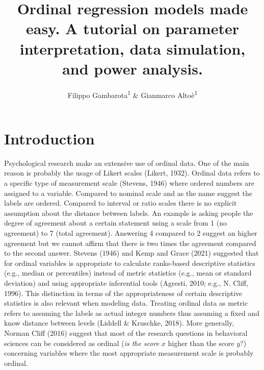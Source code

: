 \documentclass[
  man,floatsintext]{apa6}
\title{Ordinal regression models made easy. A tutorial on parameter interpretation, data simulation, and power analysis.}
\author{Filippo Gambarota\textsuperscript{1} \& Gianmarco Altoè\textsuperscript{1}}
\date{}
\affiliation{\vspace{0.5cm}\textsuperscript{1} Department of Developmental Psychology and Socialization, University of Padova, Italy}
\begin{document}
\maketitle

\section{Introduction}\label{introduction}

Psychological research make an extensive use of ordinal data. One of the main reason is probably the usage of Likert scales (Likert, 1932). Ordinal data refers to a specific type of measurement scale (Stevens, 1946) where ordered numbers are assigned to a variable. Compared to nominal scale and as the name suggest the labels are ordered. Compared to interval or ratio scales there is no explicit assumption about the distance between labels. An example is asking people the degree of agreement about a certain statement using a scale from 1 (no agreement) to 7 (total agreement). Answering 4 compared to 2 suggest an higher agreement but we cannot affirm that there is two times the agreement compared to the second answer. Stevens (1946) and Kemp and Grace (2021) suggested that for ordinal variables is appropriate to calculate ranks-based descriptive statistics (e.g., median or percentiles) instead of metric statistics (e.g., mean or standard deviation) and using appropriate inferential tools (Agresti, 2010; e.g., N. Cliff, 1996). This distinction in terms of the appropriateness of certain descriptive statistics is also relevant when modeling data. Treating ordinal data as metric refers to assuming the labels as actual integer numbers thus assuming a fixed and know distance between levels (Liddell \& Kruschke, 2018). More generally, Norman Cliff (2016) suggest that most of the research questions in behavioral sciences can be considered as ordinal (\emph{is the score} \(x\) higher than the score \(y\)?) concerning variables where the most appropriate measurement scale is probably ordinal.
\end{document}
